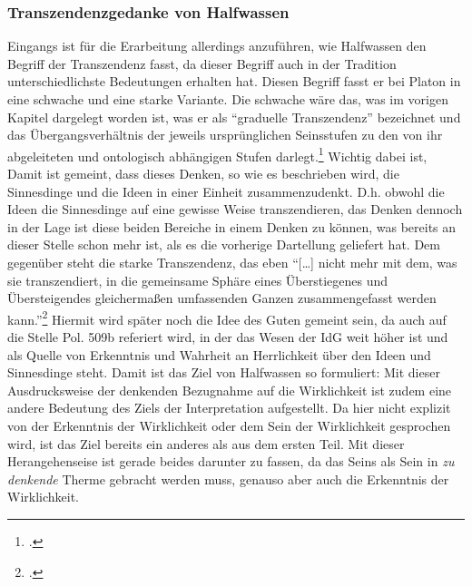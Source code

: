 \subsubsection{Transzendenzgedanke von Halfwassen}
Eingangs ist für die Erarbeitung allerdings anzuführen, wie Halfwassen den Begriff der Transzendenz fasst, da dieser Begriff auch in der Tradition unterschiedlichste Bedeutungen erhalten hat. Diesen Begriff fasst er bei Platon in eine schwache und eine starke Variante. Die schwache wäre das, was im vorigen Kapitel dargelegt worden ist, was er als \enquote{graduelle Transzendenz} bezeichnet und das Übergangsverhältnis der jeweils ursprünglichen Seinsstufen zu den von ihr abgeleiteten und ontologisch abhängigen Stufen darlegt.\footcite[vgl.][S. 29]{halfwassen2015spuren} Wichtig dabei ist,  Damit ist gemeint, dass dieses Denken, so wie es beschrieben wird, die Sinnesdinge und die Ideen in einer Einheit zusammenzudenkt. D.h. obwohl die Ideen die Sinnesdinge auf eine gewisse Weise transzendieren, das Denken dennoch in der Lage ist diese beiden Bereiche in einem Denken zu können, was bereits an dieser Stelle schon mehr ist, als es die vorherige Dartellung geliefert hat.
Dem gegenüber steht die starke Transzendenz, das eben \enquote{[\dots] nicht mehr mit dem, was sie transzendiert, in die gemeinsame Sphäre eines Überstiegenes und Übersteigendes gleichermaßen umfassenden Ganzen zusammengefasst werden kann.}\footcite[vgl.][S. 29]{halfwassen2015spuren} Hiermit wird später noch die Idee des Guten gemeint sein, da auch auf die Stelle Pol. 509b referiert wird, in der das Wesen der IdG weit höher ist und als Quelle von Erkenntnis und Wahrheit an Herrlichkeit über den Ideen und Sinnesdinge steht.
Damit ist das Ziel von Halfwassen so formuliert:
Mit dieser Ausdrucksweise der denkenden Bezugnahme auf die Wirklichkeit ist zudem eine andere Bedeutung des Ziels der Interpretation aufgestellt. Da hier nicht explizit von der Erkenntnis der Wirklichkeit oder dem Sein der Wirklichkeit gesprochen wird, ist das Ziel bereits ein anderes als aus dem ersten Teil. Mit dieser Herangehenseise ist gerade beides darunter zu fassen, da das Seins als Sein in \emph{zu denkende} Therme gebracht werden muss, genauso aber auch die Erkenntnis der Wirklichkeit.


